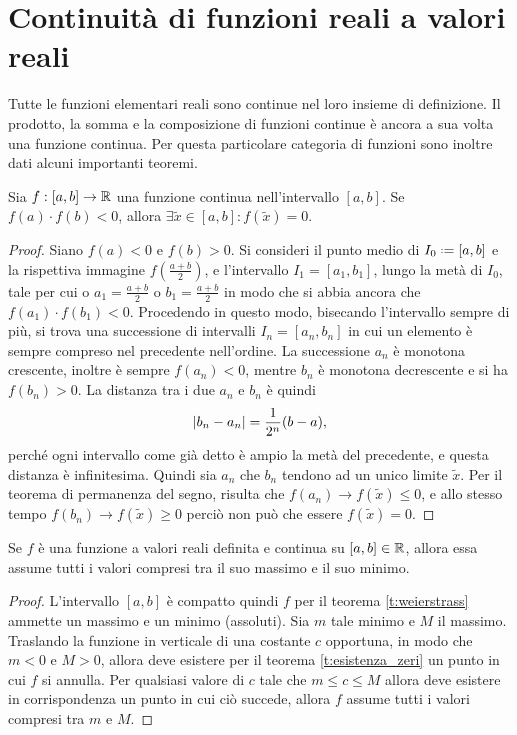 \section{Continuità di funzioni reali a valori reali}
Tutte le funzioni elementari reali sono continue nel loro insieme di definizione. Il prodotto, la somma e la composizione di funzioni continue è ancora a sua volta una funzione continua. Per questa particolare categoria di funzioni sono inoltre dati alcuni importanti teoremi.
\begin{teorema} \label{t:esistenza_zeri}
Sia $f:[a,b]\to\mathbb{R}$ una funzione continua nell'intervallo $[a,b]$. Se $f(a)\cdot f(b)<0$, allora $\exists\tilde{x}\in[a,b]\colon f(\tilde{x})=0$.
\end{teorema}
\begin{proof}
Siano $f(a)<0$ e $f(b)>0$. Si consideri il punto medio di $I_0\defeq[a,b]$ e la rispettiva immagine $f(\frac{a+b}{2})$, e l'intervallo $I_1=[a_1,b_1]$, lungo la metà di $I_0$, tale per cui o $a_1=\frac{a+b}{2}$ o $b_1=\frac{a+b}{2}$ in modo che si abbia ancora che $f(a_1)\cdot f(b_1)<0$. Procedendo in questo modo, bisecando l'intervallo sempre di più, si trova una successione di intervalli $I_n=[a_n,b_n]$ in cui un elemento è sempre compreso nel precedente nell'ordine.
La successione $a_n$ è monotona crescente, inoltre è sempre $f(a_n)<0$, mentre $b_n$ è monotona decrescente e si ha $f(b_n)>0$. La distanza tra i due $a_n$ e $b_n$ è quindi
\[
	\lvert b_n-a_n\rvert=\frac1{2^n}(b-a),
\]
perché ogni intervallo come già detto è ampio la metà del precedente, e questa distanza è infinitesima. Quindi sia $a_n$ che $b_n$ tendono ad un unico limite $\tilde{x}$. Per il teorema di permanenza del segno, risulta che $f(a_n)\to f(\tilde{x})\leq 0$, e allo stesso tempo $f(b_n)\to f(\tilde{x})\geq 0$ perciò non può che essere $f(\tilde{x})=0$.
\end{proof}
\begin{teorema}
\label{t:valori_intermedi}
Se $f$ è una funzione a valori reali definita e continua su $[a,b]\in\mathbb{R}$, allora essa assume tutti i valori compresi tra il suo massimo e il suo minimo.
\end{teorema}
\begin{proof}
L'intervallo $[a,b]$ è compatto quindi $f$ per il teorema \ref{t:weierstrass} ammette un massimo e un minimo (assoluti). Sia $m$ tale minimo e $M$ il massimo. Traslando la funzione in verticale di una costante $c$ opportuna, in modo che $m<0$ e $M>0$, allora deve esistere per il teorema \ref{t:esistenza_zeri} un punto in cui $f$ si annulla. Per qualsiasi valore di $c$ tale che $m\leq c\leq M$ allora deve esistere in corrispondenza un punto in cui ciò succede, allora $f$ assume tutti i valori compresi tra $m$ e $M$.
\end{proof}
